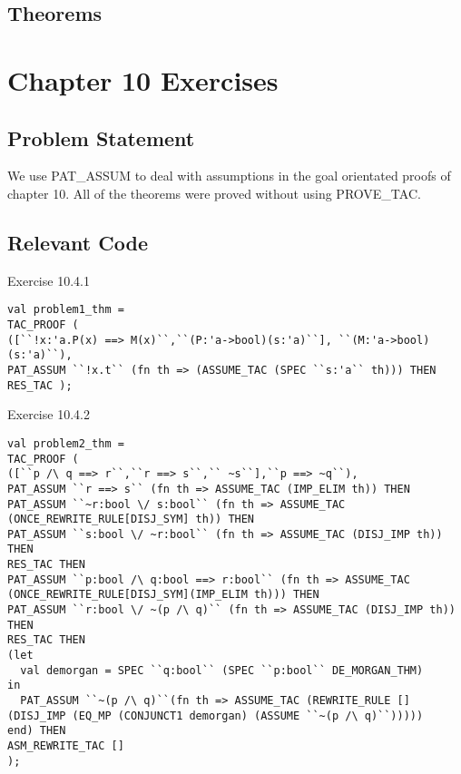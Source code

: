 \documentclass[11pt, twoside]{article}
\begin{document}


\subsection{Theorems}

\HOLexerciseNineTheorems



\cleardoublepage


\section{Chapter 10 Exercises}
\label{sec:Chap10}

\subsection{Problem Statement}
We use PAT_ASSUM to deal with assumptions in the goal orientated proofs of chapter 10. All of the theorems were proved without using PROVE_TAC.

\subsection{Relevant Code}

Exercise 10.4.1
\begin{lstlisting}[basicstyle=\tiny,]
val problem1_thm = 
TAC_PROOF (
([``!x:'a.P(x) ==> M(x)``,``(P:'a->bool)(s:'a)``], ``(M:'a->bool)(s:'a)``),
PAT_ASSUM ``!x.t`` (fn th => (ASSUME_TAC (SPEC ``s:'a`` th))) THEN
RES_TAC );
\end{lstlisting}

Exercise 10.4.2
\begin{lstlisting}[basicstyle=\tiny,]
val problem2_thm = 
TAC_PROOF (
([``p /\ q ==> r``,``r ==> s``,`` ~s``],``p ==> ~q``),
PAT_ASSUM ``r ==> s`` (fn th => ASSUME_TAC (IMP_ELIM th)) THEN
PAT_ASSUM ``~r:bool \/ s:bool`` (fn th => ASSUME_TAC (ONCE_REWRITE_RULE[DISJ_SYM] th)) THEN
PAT_ASSUM ``s:bool \/ ~r:bool`` (fn th => ASSUME_TAC (DISJ_IMP th)) THEN
RES_TAC THEN
PAT_ASSUM ``p:bool /\ q:bool ==> r:bool`` (fn th => ASSUME_TAC (ONCE_REWRITE_RULE[DISJ_SYM](IMP_ELIM th))) THEN
PAT_ASSUM ``r:bool \/ ~(p /\ q)`` (fn th => ASSUME_TAC (DISJ_IMP th)) THEN
RES_TAC THEN
(let
  val demorgan = SPEC ``q:bool`` (SPEC ``p:bool`` DE_MORGAN_THM)
in
  PAT_ASSUM ``~(p /\ q)``(fn th => ASSUME_TAC (REWRITE_RULE [] (DISJ_IMP (EQ_MP (CONJUNCT1 demorgan) (ASSUME ``~(p /\ q)``)))))
end) THEN
ASM_REWRITE_TAC []
);
\end{lstlisting}
\end{document}
